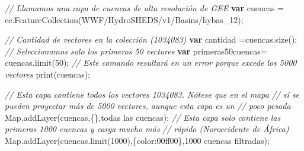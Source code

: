\documentclass[
  12pt,
  letterpaper,
  twoside]{book}
\newenvironment{Shaded}{\begin{snugshade}}{\end{snugshade}}
\newcommand{\CommentTok}[1]{\textcolor[rgb]{0.24,0.58,0.00}{\textit{#1}}}
\newcommand{\ControlFlowTok}[1]{\textcolor[rgb]{0.00,0.00,0.00}{\textbf{#1}}}
\newcommand{\DataTypeTok}[1]{\textcolor[rgb]{0.00,0.00,0.00}{#1}}
\newcommand{\DecValTok}[1]{\textcolor[rgb]{0.28,0.53,0.93}{#1}}
\newcommand{\FunctionTok}[1]{\textcolor[rgb]{0.48,0.12,0.64}{#1}}
\newcommand{\KeywordTok}[1]{\textcolor[rgb]{0.48,0.12,0.64}{#1}}
\newcommand{\NormalTok}[1]{#1}
\newcommand{\OperatorTok}[1]{\textcolor[rgb]{0.00,0.00,0.00}{#1}}
\newcommand{\StringTok}[1]{\textcolor[rgb]{0.87,0.29,0.22}{#1}}
\begin{document}
\begin{Shaded}
\begin{Highlighting}[]
\CommentTok{// Llamamos una capa de cuencas de alta resolución de GEE}
\ControlFlowTok{var}\NormalTok{ cuencas }\OperatorTok{=} \KeywordTok{ee}\OperatorTok{.}\FunctionTok{FeatureCollection}\NormalTok{(}\StringTok{\textquotesingle{}WWF/HydroSHEDS/v1/Basins/hybas\_12\textquotesingle{}}\NormalTok{)}\OperatorTok{;}

\CommentTok{// Cantidad de vectores en la colección (1034083)}
\ControlFlowTok{var}\NormalTok{ cantidad }\OperatorTok{=}\NormalTok{cuencas}\OperatorTok{.}\FunctionTok{size}\NormalTok{()}\OperatorTok{;} 
\CommentTok{// Seleccionamos solo los primeros 50 vectores}
\ControlFlowTok{var}\NormalTok{ primeras50cuencas}\OperatorTok{=}\NormalTok{ cuencas}\OperatorTok{.}\FunctionTok{limit}\NormalTok{(}\DecValTok{50}\NormalTok{)}\OperatorTok{;} 
\CommentTok{// Este comando resultará en un error porque excede los 5000 vectores}
\FunctionTok{print}\NormalTok{(cuencas)}\OperatorTok{;} 

\CommentTok{// Esta capa contiene todos los vectores 1034083. Nótese que en el mapa }
\CommentTok{// sí se pueden proyectar más de 5000 vectores, aunque esta capa es un }
\CommentTok{// poco pesada }
\KeywordTok{Map}\OperatorTok{.}\FunctionTok{addLayer}\NormalTok{(cuencas}\OperatorTok{,}\NormalTok{\{\}}\OperatorTok{,}\StringTok{\textquotesingle{}todas las cuencas\textquotesingle{}}\NormalTok{)}\OperatorTok{;}
\CommentTok{// Esta capa solo contiene las primeras 1000 cuencas y carga mucho más }
\CommentTok{// rápido (Noroccidente de África)}
\KeywordTok{Map}\OperatorTok{.}\FunctionTok{addLayer}\NormalTok{(cuencas}\OperatorTok{.}\FunctionTok{limit}\NormalTok{(}\DecValTok{1000}\NormalTok{)}\OperatorTok{,}\NormalTok{\{}\DataTypeTok{color}\OperatorTok{:}\StringTok{\textquotesingle{}00ff00\textquotesingle{}}\NormalTok{\}}\OperatorTok{,}\StringTok{\textquotesingle{}1000 cuencas filtradas\textquotesingle{}}\NormalTok{)}\OperatorTok{;}
\end{Highlighting}
\end{Shaded}
\end{document}
